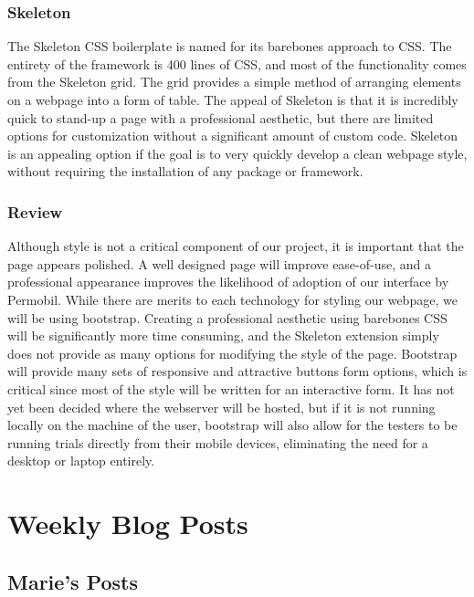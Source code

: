 \documentclass[onecolumn, draftclsnofoot,10pt, compsoc]{report}
\begin{document}
\subsection{Skeleton}
The Skeleton CSS boilerplate is named for its barebones approach to CSS. The entirety of the framework is 400 lines
of CSS, and most of the functionality comes from the Skeleton grid. The grid provides a simple method of arranging
elements on a webpage into a form of table. The appeal of Skeleton is that it is incredibly quick to stand-up a page
with a professional aesthetic, but there are limited options for customization without a significant amount of custom
code. Skeleton is an appealing option if the goal is to very quickly develop a clean webpage style, without requiring the
installation of any package or framework.
\subsection{Review}
Although style is not a critical component of our project, it is important that the page appears polished. A well designed
page will improve ease-of-use, and a professional appearance improves the likelihood of adoption of our interface by
Permobil. While there are merits to each technology for styling our webpage, we will be using bootstrap. Creating a
professional aesthetic using barebones CSS will be significantly more time consuming, and the Skeleton extension simply
does not provide as many options for modifying the style of the page. Bootstrap will provide many sets of responsive
and attractive buttons form options, which is critical since most of the style will be written for an interactive form. It
has not yet been decided where the webserver will be hosted, but if it is not running locally on the machine of the user,
bootstrap will also allow for the testers to be running trials directly from their mobile devices, eliminating the need for
a desktop or laptop entirely.


\chapter{Weekly Blog Posts}
\minitoc
\section{Marie's Posts}
\end{document}
